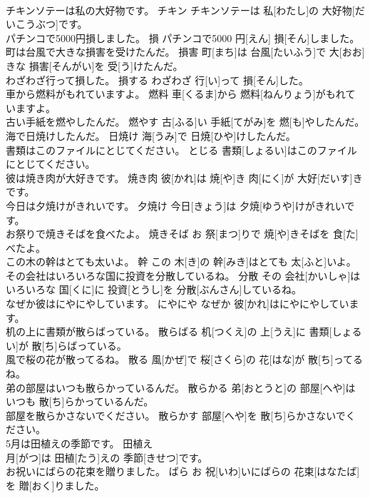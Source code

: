 \documentclass[8pt]{extreport}
\begin{document}
\begin{CJK}{UTF8}{min}
\\	チキンソテーは私の大好物です。	チキン	チキンソテーは 私[わたし]の 大好物[だいこうぶつ]です。	
\\	パチンコで5000円損しました。	損	パチンコで5000 円[えん] 損[そん]しました。	
\\	町は台風で大きな損害を受けたんだ。	損害	町[まち]は 台風[たいふう]で 大[おお]きな 損害[そんがい]を 受[う]けたんだ。	
\\	わざわざ行って損した。	損する	わざわざ 行[い]って 損[そん]した。	
\\	車から燃料がもれていますよ。	燃料	車[くるま]から 燃料[ねんりょう]がもれていますよ。	
\\	古い手紙を燃やしたんだ。	燃やす	古[ふる]い 手紙[てがみ]を 燃[も]やしたんだ。	
\\	海で日焼けしたんだ。	日焼け	海[うみ]で 日焼[ひや]けしたんだ。	
\\	書類はこのファイルにとじてください。	とじる	書類[しょるい]はこのファイルにとじてください。	
\\	彼は焼き肉が大好きです。	焼き肉	彼[かれ]は 焼[や]き 肉[にく]が 大好[だいす]きです。	
\\	今日は夕焼けがきれいです。	夕焼け	今日[きょう]は 夕焼[ゆうや]けがきれいです。	
\\	お祭りで焼きそばを食べたよ。	焼きそば	お 祭[まつ]りで 焼[や]きそばを 食[た]べたよ。	
\\	この木の幹はとても太いよ。	幹	この 木[き]の 幹[みき]はとても 太[ふと]いよ。	
\\	その会社はいろいろな国に投資を分散しているね。	分散	その 会社[かいしゃ]はいろいろな 国[くに]に 投資[とうし]を 分散[ぶんさん]しているね。	
\\	なぜか彼はにやにやしています。	にやにや	なぜか 彼[かれ]はにやにやしています。	
\\	机の上に書類が散らばっている。	散らばる	机[つくえ]の 上[うえ]に 書類[しょるい]が 散[ち]らばっている。	
\\	風で桜の花が散ってるね。	散る	風[かぜ]で 桜[さくら]の 花[はな]が 散[ち]ってるね。	
\\	弟の部屋はいつも散らかっているんだ。	散らかる	弟[おとうと]の 部屋[へや]はいつも 散[ち]らかっているんだ。	
\\	部屋を散らかさないでください。	散らかす	部屋[へや]を 散[ち]らかさないでください。	
\\	5月は田植えの季節です。	田植え	
\\	月[がつ]は 田植[たう]えの 季節[きせつ]です。	
\\	お祝いにばらの花束を贈りました。	ばら	お 祝[いわ]いにばらの 花束[はなたば]を 贈[おく]りました。	

\end{CJK}
\end{document}
